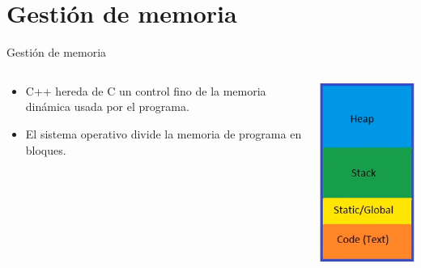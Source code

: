 \documentclass[aspectratio=169,presentation]{beamer}
\begin{document}
\section{Gestión de memoria}
\label{sec:org24be6cc}
\begin{frame}[label={sec:orgbb76bd9}]{Gestión de memoria}
\begin{columns}
\begin{column}{0.48\columnwidth}
\begin{itemize}
\item C++ hereda de C un control fino de la memoria dinámica usada por el programa.
\item El sistema operativo divide la memoria de programa en bloques.
\end{itemize}
\end{column}
\begin{column}{0.28\columnwidth}
\begin{center}
\includegraphics[width=.9\linewidth]{./img/heap-stack-color.png}
\end{center}
\end{column}
\end{columns}
\end{frame}
\end{document}
